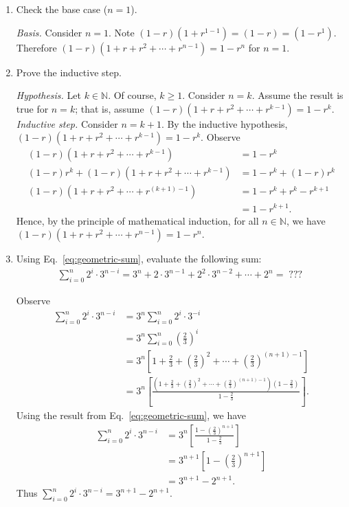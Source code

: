 \begin{enumerate}
    \item Check the base case ($n=1$).
\begin{solution}
\textit{Basis. }Consider $n=1$. Note $(1-r)(1+r^{1-1})=(1-r)=(1-r^1)$. Therefore $(1-r)(1+r+r^2+\cdots+r^{n-1})=1-r^n$ for $n=1$.
\end{solution}   
    \item Prove the inductive step.
\begin{solution}
\textit{Hypothesis. }Let $k\in\mathbb{N}$. Of course, $k\geq 1$. Consider $n=k$. Assume the result is true for $n=k$; that is, assume $(1-r)(1+r+r^2+\cdots+r^{k-1})=1-r^k$.\\

\textit{Inductive step. }Consider $n=k+1$. By the inductive hypothesis, $(1-r)(1+r+r^2+\cdots+r^{k-1})=1-r^k$. Observe
\begin{align*}
(1-r)(1+r+r^2+\cdots+r^{k-1})&=1-r^k\\
(1-r)r^k+(1-r)(1+r+r^2+\cdots+r^{k-1})&=1-r^k+(1-r)r^k\\
(1-r)(1+r+r^2+\cdots+r^{(k+1)-1})&=1-r^k+r^k-r^{k+1}\\
&=1-r^{k+1}.
\end{align*}
Hence, by the principle of mathematical induction, for all $n\in\mathbb{N}$, we have $(1-r)(1+r+r^2+\cdots+r^{n-1})=1-r^n$.~\square
\end{solution}
    \item Using Eq.~\eqref{eq:geometric-sum}, evaluate the following sum:
    \begin{align*}
        \sum_{i = 0}^n 2^i \cdot 3^{n-i}
        =
        3^n + 2\cdot 3^{n-1} + 2^2 \cdot 3^{n-2} + \cdots + 2^n =\; ???\;
    \end{align*}
\begin{solution}
Observe
\begin{align*}
\sum_{i=0}^{n}{2^i\cdot3^{n-i}}&=3^n\sum_{i=0}^{n}{2^i\cdot3^{-i}}\\
&=3^n\sum_{i=0}^n{\left(\frac{2}{3}\right)^i}\\
&=3^n\left[1+\frac{2}{3}+\left(\frac{2}{3}\right)^2+\cdots+\left(\frac{2}{3}\right)^{(n+1)-1}\right]\\
&=3^n\left[\frac{\left(1+\frac{2}{3}+\left(\frac{2}{3}\right)^2+\cdots+\left(\frac{2}{3}\right)^{(n+1)-1}\right)\left(1-\frac{2}{3}\right)}{1-\frac{2}{3}}\right].
\end{align*}
Using the result from Eq.~\eqref{eq:geometric-sum}, we have
\begin{align*}
\sum_{i=0}^{n}{2^i\cdot3^{n-i}}&=3^n\left[\frac{1-\left(\frac{2}{3}\right)^{n+1}}{1-\frac{2}{3}}\right]\\
&=3^{n+1}\left[1-\left(\frac{2}{3}\right)^{n+1}\right]\\
&=3^{n+1}-2^{n+1}.
\end{align*}
Thus $\sum_{i=0}^{n}{2^i\cdot3^{n-i}}=3^{n+1}-2^{n+1}$.~\square
\end{solution}
\end{enumerate}

